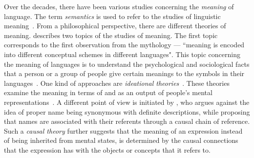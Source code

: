 Over the decades, there have been various studies concerning the \emph{meaning} of language. The term \emph{semantics} is used to refer to the studies of linguistic meaning~\citep{katz1972, palmer1981semantics}. From a philosophical perspective, there are different theories of meaning. \citet{lewis1970} describes two topics of the studies of meaning. The first topic corresponds to the first observation from the mythology --- ``meaning is encoded into different conceptual schemes in different languages". This topic concerning the meaning of languages is to understand the psychological and sociological facts that a person or a group of people give certain meanings to the symbols in their languages~\citep{lewis1970}. One kind of approaches are \emph{ideational theories}~\citep{ChapmanRoutledge+2009+84+85}. These theories examine the meaning in terms of and as an output of people's mental representations~\citep{Stich1994-STIMR}. A different point of view is initiated by \citet{Kripke1980-KRINAN}, who argues against the idea of proper name being synonymous with definite descriptions, while proposing that names are associated with their referents through a causal chain of reference. Such a \emph{causal theory} further suggests that the meaning of an expression instead of being inherited from mental states, is determined by the causal connections that the expression has with the objects or concepts that it refers to. 


